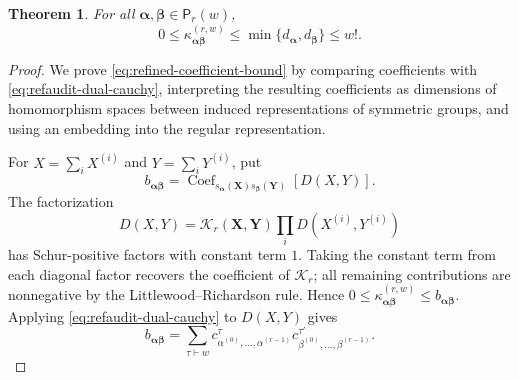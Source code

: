 \documentclass[12pt,reqno,a4paper]{amsart}
\numberwithin{equation}{section}
\numberwithin{figure}{section}
\theoremstyle{plain}
\newtheorem{theorem}{Theorem}[section]
\theoremstyle{definition}
\DeclareMathOperator{\Coef}{Coef}
\begin{document}
\begin{theorem}
\label{thm:universal-refined-bound}
For all $\boldsymbol\alpha,\boldsymbol\beta\in\mathsf P_r(w)$,
\begin{equation}\label{eq:refined-coefficient-bound}
 0\leq
 \kappa^{(r,w)}_{\boldsymbol\alpha\boldsymbol\beta}
 \leq\min\{d_{\boldsymbol\alpha},d_{\boldsymbol\beta}\}
 \leq w!.
\end{equation}
\end{theorem}

\begin{proof}
We prove \eqref{eq:refined-coefficient-bound} by comparing
coefficients with \eqref{eq:refaudit-dual-cauchy}, interpreting the
resulting coefficients as dimensions of homomorphism spaces between
induced representations of symmetric groups, and using an embedding
into the regular representation.

For $X=\sum_iX^{(i)}$ and $Y=\sum_iY^{(i)}$, put
\[
 b_{\boldsymbol\alpha\boldsymbol\beta}
 =\Coef_{s_{\boldsymbol\alpha}(\mathbf X)s_{\boldsymbol\beta}(\mathbf Y)}
       [D(X,Y)].
\]
The factorization
\[
 D(X,Y)=\mathcal K_r(\mathbf X,\mathbf Y)
             \prod_iD(X^{(i)},Y^{(i)})
\]
has Schur-positive factors with constant term $1$.  Taking the
constant term from each diagonal factor recovers the coefficient
of $\mathcal K_r$; all remaining contributions are nonnegative by
the Littlewood--Richardson rule.  Hence
$0\leq\kappa^{(r,w)}_{\boldsymbol\alpha\boldsymbol\beta}
\leq b_{\boldsymbol\alpha\boldsymbol\beta}$.
Applying \eqref{eq:refaudit-dual-cauchy} to $D(X,Y)$ gives
\[
 b_{\boldsymbol\alpha\boldsymbol\beta}
 =\sum_{\tau\vdash w}
   c^\tau_{\alpha^{(0)},\ldots,\alpha^{(r-1)}}
   c^{\tau'}_{\beta^{(0)},\ldots,\beta^{(r-1)}}.
\]


\end{proof}
\end{document}
